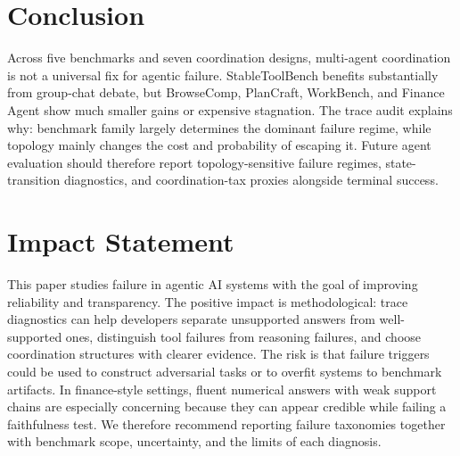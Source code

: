 \documentclass{article}
\theoremstyle{plain}
\theoremstyle{definition}
\theoremstyle{remark}
\begin{document}
\section{Conclusion}
Across five benchmarks and seven coordination designs, multi-agent coordination is not a universal fix for agentic failure. StableToolBench benefits substantially from group-chat debate, but BrowseComp, PlanCraft, WorkBench, and Finance Agent show much smaller gains or expensive stagnation. The trace audit explains why: benchmark family largely determines the dominant failure regime, while topology mainly changes the cost and probability of escaping it. Future agent evaluation should therefore report topology-sensitive failure regimes, state-transition diagnostics, and coordination-tax proxies alongside terminal success.

\section*{Impact Statement}
This paper studies failure in agentic AI systems with the goal of improving reliability and transparency. The positive impact is methodological: trace diagnostics can help developers separate unsupported answers from well-supported ones, distinguish tool failures from reasoning failures, and choose coordination structures with clearer evidence. The risk is that failure triggers could be used to construct adversarial tasks or to overfit systems to benchmark artifacts. In finance-style settings, fluent numerical answers with weak support chains are especially concerning because they can appear credible while failing a faithfulness test. We therefore recommend reporting failure taxonomies together with benchmark scope, uncertainty, and the limits of each diagnosis.




\newpage
\appendix
\onecolumn
\end{document}
